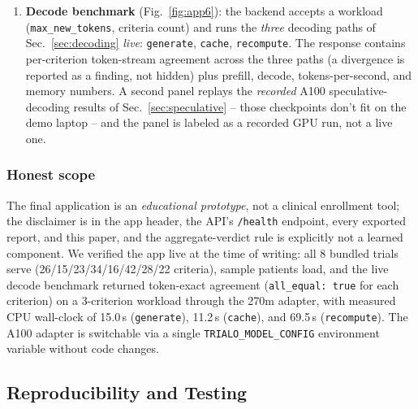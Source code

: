 \documentclass[conference]{IEEEtran}
\newcommand{\code}[1]{\texttt{\small #1}}
\begin{document}
\begin{enumerate}[leftmargin=*, itemsep=1pt, topsep=2pt]
Markdown$\to$HTML$\to$PDF pipeline (weasyprint) renders a
multi-page screening report containing the disclaimer, the
provenance block (model, adapter path, device, decoding path,
timestamp), the aggregate verdict, and every
criterion/evidence pair.
\item \textbf{Decode benchmark} (Fig.~\ref{fig:app6}): the
backend accepts a workload (\code{max\_new\_tokens},
criteria count) and runs the \emph{three} decoding paths of
Sec.~\ref{sec:decoding} \emph{live}: \code{generate},
\code{cache}, \code{recompute}. The response contains
per-criterion token-stream agreement across the three paths
(a divergence is reported as a finding, not hidden) plus
prefill, decode, tokens-per-second, and memory numbers. A
second panel replays the \emph{recorded} A100
speculative-decoding results of
Sec.~\ref{sec:speculative} -- those checkpoints don't fit on the
demo laptop -- and the panel is labeled as a recorded GPU run,
not a live one.
\end{enumerate}

\subsubsection{Honest scope}
The final application is an \emph{educational prototype}, not a
clinical enrollment tool; the disclaimer is in the app header,
the API's \code{/health} endpoint, every exported report, and
this paper, and the aggregate-verdict rule is explicitly
not a learned component. We verified the app live at the time
of writing: all 8 bundled trials serve
(26/15/23/34/16/42/28/22 criteria), sample patients load, and
the live decode benchmark returned token-exact agreement
(\code{all\_equal: true} for each criterion) on a 3-criterion
workload through the 270m adapter, with measured CPU wall-clock of
15.0\,s (\code{generate}), 11.2\,s (\code{cache}), and 69.5\,s
(\code{recompute}).
The A100 adapter is switchable via a single
\code{TRIALO\_MODEL\_CONFIG} environment variable without code
changes.

\subsection{Reproducibility and Testing}
\label{sec:repro}
\end{document}
